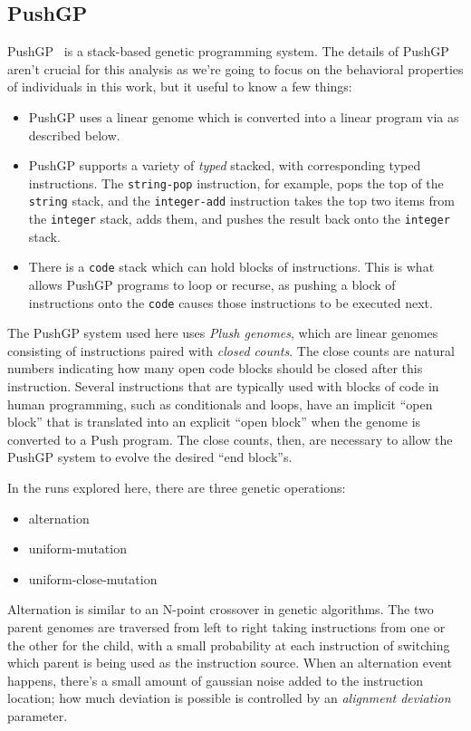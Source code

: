 \subsection{PushGP}

PushGP~\citep{spector:2002:GPEM, 1068292} is a stack-based genetic programming system. The details
of PushGP aren't crucial for this analysis as we're going to focus on the behavioral properties of
individuals in this work, but it useful to know a few things:
\begin{itemize}
	\item PushGP uses a linear genome which is converted into a linear program via as described below.
	\item PushGP supports a variety of \emph{typed} stacked, with corresponding typed instructions.
	The \texttt{string-pop} instruction, for example, pops the top of the \texttt{string} stack,
	and the \texttt{integer-add} instruction takes the top two items from the \texttt{integer}
	stack, adds them, and pushes the result back onto the \texttt{integer} stack.
	\item There is a \texttt{code} stack which can hold blocks of instructions. This is what allows
	PushGP programs to loop or recurse, as pushing a block of instructions onto the \texttt{code}
	causes those instructions to be executed next.
\end{itemize}

The PushGP system used here uses \emph{Plush genomes}, which are linear genomes consisting of 
instructions paired with \emph{closed counts}. The close counts are natural numbers 
indicating how many open code blocks should be closed after this instruction. Several instructions
that are typically used with blocks of code in human programming, such as conditionals and loops,
have an implicit ``open block'' that is translated into an explicit ``open block'' when the genome
is converted to a Push program. The close counts, then, are necessary to allow the PushGP
system to evolve the desired ``end block''s.

In the runs explored here, there are three genetic operations:
\begin{itemize}
	\item alternation
	\item uniform-mutation
	\item uniform-close-mutation
\end{itemize}
Alternation is similar to an N-point crossover in genetic algorithms. The two parent genomes
are traversed from left to right taking instructions from one or the other for the child, with
a small probability at each instruction of switching which parent is being used as the instruction
source. When an alternation event happens, there's a small amount of gaussian noise added to the
instruction location; how much deviation is possible is controlled by an \emph{alignment deviation} 
parameter.

